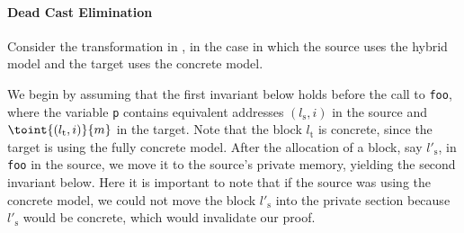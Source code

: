 
\paragraph{Dead Cast Elimination}

Consider the transformation in , in the case in which
the source uses the hybrid model and the target uses the concrete model.

We begin by assuming that the first invariant below holds before the call to
\texttt{foo}, where the variable \texttt{p} contains equivalent
addresses $(l_\text{s},i)$ in the source and $\toint{(l_\text{t},i)}{m}$ in the target.
Note that the block $l_\text{t}$ is concrete, since the target is using
the fully concrete model. After the allocation of a block, say
$l'_\text{s}$, in \texttt{foo} in the source, we move it to the source's
private memory, yielding the second invariant below.  Here it is important
to note that if the source was using the concrete model, we could not move
the block $l'_\text{s}$ into the private section because $l'_\text{s}$
would be concrete, which would invalidate our proof.

